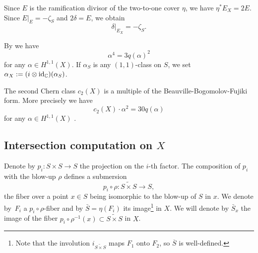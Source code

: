 \documentclass[11pt]{article}
\theoremstyle{plain}
\theoremstyle{definition}
\newcommand{\holom}[3]{\ensuremath{#1:#2\to #3}}
\newcommand{\fibre}[2]{\ensuremath{#1^{-1} (#2)}}
\newcommand{\barS}{\ensuremath{\overline{S}}}
\newcommand{\blS}{\ensuremath{\widetilde{S \times S}}}
\DeclareMathOperator{\id}{id}
\begin{document}
Since $E$ is the ramification divisor of the two-to-one cover $\eta$, we have $\eta^* E_X = 2 E$.
Since $E|_E = -\zeta_S$ and $2 \delta = E$, we obtain
\begin{equation} \label{restrictdelta}
\delta|_{E_X} = - \zeta_S.
\end{equation}

By \cite[\S 9, Lem.\,1]{Bea83} we have
\begin{equation} \label{qsurface}
\alpha^4 = 3 q(\alpha)^2
\end{equation}
for any $\alpha\in H^{1,1} (X)$. If $\alpha_S$ is any $(1,1)$-class on $S$, we set $\alpha_X:= (i \otimes \id_\C)(\alpha_S)$.

The second Chern class $c_2(X)$ is a multiple of the Beauville-Bogomolov-Fujiki form. More precisely we have
\begin{equation} \label{qctwo}
c_2(X) \cdot \alpha^2 = 30 q(\alpha)
\end{equation}
for any $\alpha\in H^{1,1} (X)$ \cite[\S 3.1]{Ott15}.

\subsection{Intersection computation on $X$}

Denote by $\holom{p_i}{S \times S}{S}$ the projection on the $i$-th factor.
The composition of $p_i$ with the blow-up $\rho$ defines a submersion
\[
p_i \circ \rho: \blS \to S,
\]
the fiber over a point $x \in S$ being isomorphic to the blow-up of $S$ in $x$.
We denote by~$F_i$ a $p_i \circ \rho$-fiber and by $\bar S = \eta(F_i)$ its image\footnote{Note that the involution $i_{\blS}$ maps $F_1$ onto $F_2$, so $\barS$ is well-defined.} in $X$.
We will denote by $\bar S_x$ the image of the fiber $\fibre{p_i \circ \rho}{x} \subset \blS$ in $X$.
\end{document}
